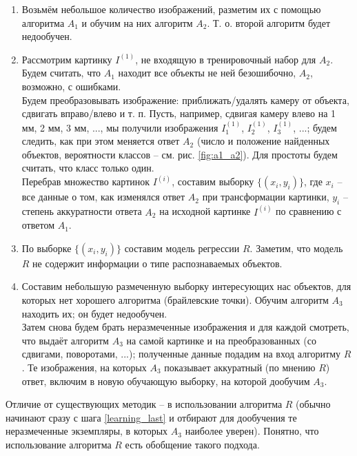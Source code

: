 \documentclass[a4paper,12pt]{article} %
\begin{document}
\begin{enumerate}
    \item Возьмём небольшое количество изображений, разметим их с помощью алгоритма $ A_1 $ и обучим на них алгоритм $ A_2 $. Т. о. второй алгоритм будет недообучен.

    \item Рассмотрим картинку $ I^{(1)} $, не входящую в тренировочный набор для $ A_2 $. Будем считать, что $ A_1 $ находит все объекты не ней безошибочно, $ A_2 $, возможно, с ошибками. \\
    Будем преобразовывать изображение: приближать/удалять камеру от объекта, сдвигать вправо/влево и т. п.
    Пусть, например, сдвигая камеру влево на 1 мм, 2 мм, 3 мм, ..., мы получили изображения $ I_1^{(1)} $, $ I_2^{(1)} $, $ I_3^{(1)} $, ...; будем следить, как при этом меняется ответ $ A_2 $ (число и положение найденных объектов, вероятности классов -- см. рис. \ref{fig:a1_a2}). Для простоты будем считать, что класс только один. \\
    Перебрав множество картинок $ I^{(i)}$, составим выборку $ \{(x_i, y_i)\} $, где $ x_i $ -- все данные о том, как изменялся ответ $ A_2 $ при трансформации картинки, $ y_i $ -- степень аккуратности ответа $ A_2 $ на исходной картинке $ I^{(i)} $ по сравнению с ответом $ A_1 $.

    \item По выборке $ \{(x_i, y_i)\} $ составим модель регрессии $ R $. Заметим, что модель $ R $ не содержит информации о типе распознаваемых объектов.

    \item Составим небольшую размеченную выборку интересующих нас объектов, для которых нет хорошего алгоритма (брайлевские точки). Обучим алгоритм $ A_3 $ находить их; он будет недообучен. \\
    Затем снова будем брать неразмеченные изображения и для каждой смотреть, что выдаёт алгоритм $ A_3 $ на самой картинке и на преобразованных (со сдвигами, поворотами, ...); полученные данные подадим на вход алгоритму $ R $. Те изображения, на которых $ A_3 $ показывает аккуратный (по мнению $ R $) ответ, включим в новую обучающую выборку, на которой дообучим $ A_3 $. \label{learning_last}

\end{enumerate}

Отличие от существующих методик -- в использовании алгоритма $ R $ (обычно начинают сразу с шага \ref{learning_last} и отбирают для дообучения те неразмеченные экземпляры, в которых $ A_3 $ наиболее уверен). Понятно, что использование алгоритма $ R $ есть обобщение такого подхода.
\end{document}
